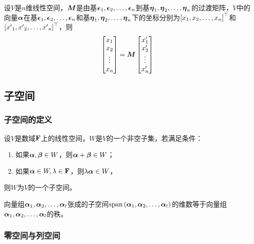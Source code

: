 \documentclass{ctexart}
\begin{document}
\begin{theorem}[坐标变换公式]
    设\(V\)是\(n\)维线性空间，\(\matm\)是由基\(\enums{\veceps}{n}\)到基\(\enums{\veceta}{n}\)的过渡矩阵，\(V\)中的向量\(\vecal\)在基\(\enums{\veceps}{n}\)和基\(\enums{\veceta}{n}\)下的坐标分别为\(\mat{\enums{x}{n}}^\top\)和\(\mat{\enums{x'}{n}}^\top\)，则
    \begin{equation*}
        \begin{bmatrix}
            x_1 \\x_2\\\vdots\\x_n
        \end{bmatrix}=\matm\begin{bmatrix}
            x'_1 \\x'_2\\\vdots\\x'_n
        \end{bmatrix}
    \end{equation*}
\end{theorem}

\subsection{子空间}

\subsubsection*{子空间的定义}

\begin{theorem}
    设\(V\)是数域\(\field\)上的线性空间，\(W\)是\(V\)的一个非空子集，若满足条件：
    \begin{enumerate}
        \item 如果\(\vecal,\vecbeta\in W\)，则\(\vecal+\vecbeta\in W\)；
        \item 如果\(\vecal\in W,\lambda\in\field\)，则\(\lambda\vecal\in W\)，
    \end{enumerate}
    则\(W\)为\(V\)的一个子空间。
\end{theorem}

\begin{theorem}
    向量组\(\enums{\vecal}{l}\)张成的子空间\(\myspan{\enums{\vecal}{l}}\)的维数等于向量组\(\enums{\vecal}{l}\)的秩。
\end{theorem}

\subsubsection*{零空间与列空间}
\end{document}
